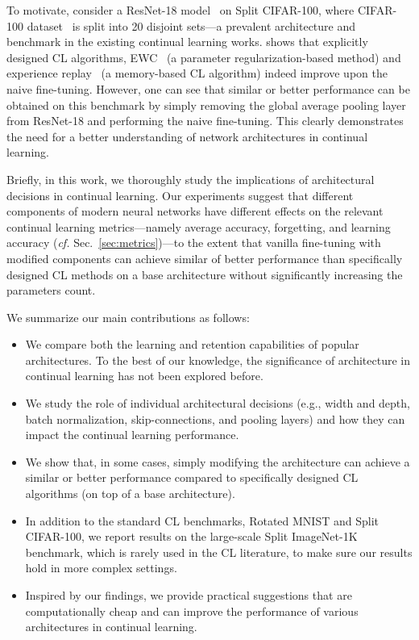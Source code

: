To motivate, consider a ResNet-18 model~\citep{he2016deep} on Split CIFAR-100, where CIFAR-100 dataset~\citep{krizhevsky2009learning} is split into 20 disjoint sets---a prevalent architecture and benchmark in the existing continual learning works.  shows that explicitly designed CL algorithms, EWC~\citep{ewc} (a parameter regularization-based method) and experience replay~\citep{riemer2018learning} (a memory-based CL algorithm) indeed improve upon the naive fine-tuning. However, one can see that similar or better performance can be obtained on this benchmark by simply removing the global average pooling layer from ResNet-18 and performing the naive fine-tuning. This clearly demonstrates the need for a better understanding of network architectures in continual learning.

Briefly, in this work, we thoroughly study the implications of architectural decisions in continual learning. Our experiments suggest that different components of modern neural networks have different effects on the relevant continual learning metrics---namely average accuracy, forgetting, and learning accuracy (\emph{cf.} Sec.~\ref{sec:metrics})---to the extent that vanilla fine-tuning with modified components can achieve similar of better performance than specifically designed CL methods on a base architecture without significantly increasing the parameters count.  

We summarize our main contributions as follows:
\begin{itemize}[leftmargin=*]
    \item We compare both the learning and retention capabilities of popular architectures. To the best of our knowledge, the significance of architecture in continual learning has not been explored before.
    
    \item We study the role of individual architectural decisions (e.g., width and depth, batch normalization, skip-connections, and pooling layers) and how they can impact the continual learning performance.
    
    \item We show that, in some cases, simply modifying the architecture can achieve a similar or better performance compared to specifically designed CL algorithms (on top of a base architecture). 
    
    \item In addition to the standard CL benchmarks, Rotated MNIST and Split CIFAR-100, we report results on the large-scale Split ImageNet-1K benchmark, which is rarely used in the CL literature, to make sure our results hold in more complex settings. 
    
    \item Inspired by our findings, we provide practical suggestions that are computationally cheap and can improve the performance of various architectures in continual learning. 
\end{itemize}

